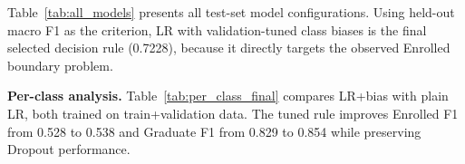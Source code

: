 \documentclass{article}
\begin{document}
Table~\ref{tab:all_models} presents all test-set model configurations. Using held-out macro F1 as the criterion, LR with validation-tuned class biases is the final selected decision rule (0.7228), because it directly targets the observed Enrolled boundary problem.

\textbf{Per-class analysis.} Table~\ref{tab:per_class_final} compares LR+bias with plain LR, both trained on train+validation data. The tuned rule improves Enrolled F1 from 0.528 to 0.538 and Graduate F1 from 0.829 to 0.854 while preserving Dropout performance.

\begin{table}[htbp]
    \centering
    \begin{minipage}[t]{0.54\textwidth}
        \centering
        \caption{Comprehensive comparison of all models on the test set.}
        \label{tab:all_models}
    \end{minipage}\hfill
    \begin{minipage}[t]{0.42\textwidth}
        \centering
        \caption{Per-class F1 comparison: LR+bias vs. plain LR.}
        \label{tab:per_class_final}
    \end{minipage}
\end{table}
\end{document}
